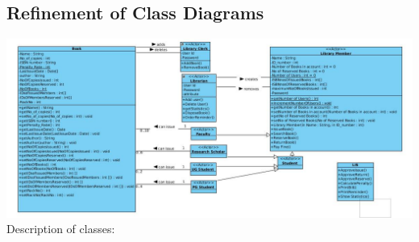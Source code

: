 \documentclass[a4paper]{article}
\begin{document}
\subsection{Refinement of Class Diagrams}
\includegraphics[scale=0.35]{images/classDiagFinal.jpg}
\\
Description of classes:
\\
\end{document}
